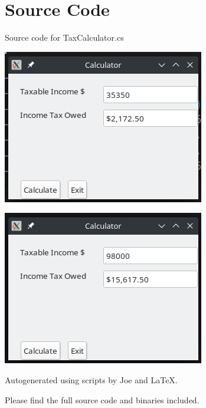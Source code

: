 \documentclass[12pt]{article}
\begin{document}
\maketitle
\pagebreak


\section{Source Code}

Source code for \textsf{TaxCalculator.cs}


\newpage



\newpage

\includegraphics{Ex1}

\includegraphics{Ex2}

\newpage

Autogenerated using scripts by Joe and \LaTeX.

Please find the full source code and binaries included.
\end{document}
